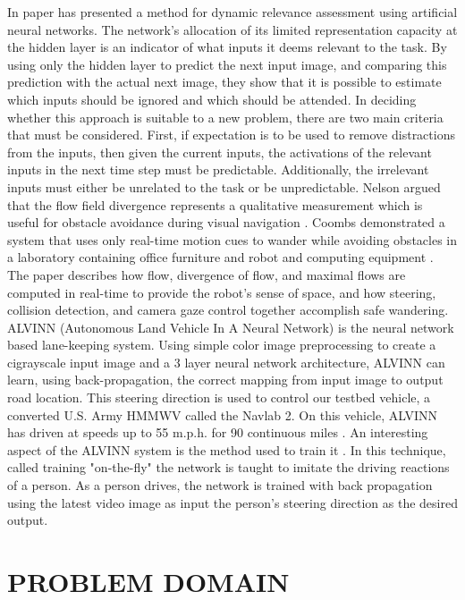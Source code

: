 \documentclass[letterpaper, 10 pt, conference]{ieeeconf}
\begin{document}
		
		In \cite{Baluja97visionbasedfocus} paper has presented a method for dynamic relevance assessment using artificial neural networks. The network’s allocation of its limited representation capacity at the hidden layer is an indicator of what inputs it deems relevant to the task. By using only the hidden layer to predict the next input image, and comparing this prediction with the actual next image, they show that it is possible to estimate which inputs should be ignored and which should be attended. In deciding whether this approach is suitable to a new problem, there are two main criteria that must be considered. First, if expectation is to be used to remove distractions from the inputs, then given the current inputs, the activations of the relevant inputs in the next time step must be predictable. Additionally, the irrelevant inputs must either be unrelated to the task or be unpredictable.
		Nelson argued that the flow field divergence represents a qualitative measurement which is useful for obstacle avoidance during visual navigation \cite{Nelson89ObstacleAvoidanceFlow}.  Coombs demonstrated a system that uses only real-time motion cues to wander while avoiding obstacles in a laboratory containing office furniture and robot and computing equipment \cite{Coombs98obstacleavoidanceflow}. The paper describes how flow, divergence of flow, and maximal flows are computed in real-time to provide the robot’s sense of space, and how steering, collision detection, and camera gaze control together accomplish safe wandering.
		ALVINN (Autonomous Land Vehicle In A Neural Network)\cite{Pomerleau93ALVINN} is the neural network based lane-keeping system. Using simple color image preprocessing to create a cigrayscale input image and a 3 layer neural network architecture, ALVINN can learn, using back-propagation, the correct mapping from input image to output road location. This steering direction is used to control our testbed vehicle, a converted U.S. Army HMMWV called the Navlab 2. On this vehicle, ALVINN has driven at speeds up to 55 m.p.h. for 90 continuous miles \cite{Jochem95visionbasedNNroaddetection}.
		An interesting aspect of the ALVINN system is the method used to train it \cite{Pomerleau93_NNforVehicles}.  In this technique, called training "on-the-fly" the network is taught to imitate the driving reactions of a person.  As a person drives, the network is trained with back propagation using the latest video image as input the person's steering direction as the desired output.

	\section*{PROBLEM DOMAIN}
\end{document}
